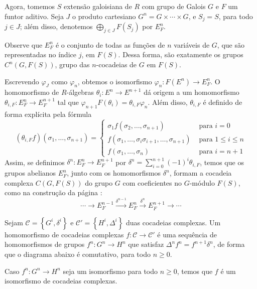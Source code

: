 Agora, tomemos $S$ extensão galoisiana de $R$ com grupo de Galois $G$ e $F$ um funtor aditivo. Seja $J$ o produto cartesiano $G^n = G\times \cdots \times G$, e $S_j = S$, para todo $j \in J$; além disso, denotemos $\bigoplus_{j\in J}F(S_j)$ por $E_F^n$. \par
Observe que $E_F^n$ é o conjunto de todas as funções de $n$ variáveis de $G$, que são representadas no índice $j$, em $F(S)$. Dessa forma, são exatamente os grupos $C^n(G, F(S))$, grupo das $n$-cocadeias de $G$ em $F(S)$. \par 
Escrevendo $\varphi_J$ como $\varphi_n$, obtemos o isomorfismo $\varphi_n: F(E^n) \rightarrow E_F^n$. O homomorfismo de $R$-álgebras $\theta_i: E^n \rightarrow E^{n+1}$ dá origem a um homomorfismo $\theta_{i,F}: E^n_F\rightarrow E_F^{n+1}$ tal que $\varphi_{n+1} F(\theta_i) = \theta_{i,F} \varphi_n$. Além disso, $\theta_{i,F}$ é definido de forma explícita pela fórmula
\[  (\theta_{i,F}f)(\sigma_1,\dots,\sigma_{n+1}) = \begin{cases} \sigma_1 f(\sigma_2,\dots,\sigma_{n+1}) &\textrm{ para }i=0 \\
    f(\sigma_1,\dots,\sigma_i\sigma_{i+1},\dots,\sigma_{n+1} ) &\textrm{ para } 1\leq i \leq n \\
    f(\sigma_1,\dots,\sigma_n) &\textrm{ para }i=n+1
    \end{cases}\]
Assim, se definimos $\delta^n: E_F^n \rightarrow E_F^{n+1}$ por $\delta^n = \sum_{i=0}^{n+1} (-1)^i \theta_{i,F}$, temos que os grupos abelianos $E_F^n$, junto com os homomorfismos $\delta^n$, formam a cocadeia complexa $C(G,F(S))$ do grupo $G$ com coeficientes no $G$-módulo $F(S)$, como na construção da página \pageref{diss:cocadeia}:
\[\cdots \rightarrow E^{n-1}_{F} \xrightarrow{\delta^{n-1}} E^n_{F} \xrightarrow{\delta^n} E^{n+1}_F \rightarrow \cdots\]

\begin{defn}
Sejam $\mathcal{C} = \left\{ G^i, \delta^{i} \right\}$ e $\mathcal{C}' = \left\{H^i, \Delta^i \right\}$ duas cocadeias complexas. Um homomorfismo de cocadeias complexas $f: \mathcal{C} \rightarrow \mathcal{C}'$ é uma sequência de homomorfismos de grupos $f^n: G^n \rightarrow H^n$ que satisfaz $\Delta^n f^n = f^{n+1} \delta^n$, de forma que o diagrama abaixo é comutativo, para todo $n\geq 0$.
\begin{center}
\end{center}
Caso $f^n:G^n \rightarrow H^n$ seja um isomorfismo para todo $n \geq 0$, temos que $f$ é um isomorfismo de cocadeias complexas.
\end{defn}

